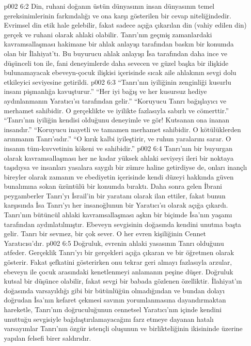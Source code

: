 \vs p002 6:2 Din, ruhani doğanın üstün dünyasının insan dünyasının temel gereksinimlerinin farkındalığı ve ona karşı gösterilen bir cevap niteliğindedir. Evrimsel din etik hale gelebilir, fakat sadece açığa çıkarılan din (vahiy edilen din) gerçek ve ruhani olarak ahlaki olabilir. Tanrı’nın geçmiş zamanlardaki kavramsallaşması hakimane bir ahlak anlayışı tarafından baskın bir konumda olan bir İlahiyat’tı. Bu buyurucu ahlak anlayışı İsa tarafından daha ince ve düşünceli ton ile, fani deneyimlerde daha sevecen ve güzel başka bir ilişkide bulunamayacak ebeveyn\hyp{}çocuk ilişkisi içerisinde sıcak aile ahlakının sevgi dolu etkileyici seviyesine getirildi.
\vs p002 6:3 “Tanrı’nın iyiliğinin zenginliği kusurlu insanı pişmanlığa kavuşturur.” “Her iyi bağış ve her kusursuz hediye aydınlanmanın Yaratıcı’sı tarafından gelir.” “Koruyucu Tanrı bağışlayıcı ve merhamet sahibidir. O gerçeklikte ve iyilikte fazlasıyla sabırlı ve cömerttir.” “Tanrı’nın iyiliğin kendisi olduğunu deneyimle ve gör! Kutsanan ona inanan insandır.” “Koruyucu inayetli ve tamamen merhamet sahibidir. O kötülüklerden arınmanın Tanrı’sıdır.” “O kırık kalbi iyileştirir, ve ruhun yaralarını sarar. O insanın tüm\hyp{}kuvvetinin kökeni ve sahibidir.”
\vs p002 6:4 Tanrı’nın bir buyurgan olarak kavramsallaşması her ne kadar yüksek ahlaki seviyeyi ileri bir noktaya taşıdıysa ve insanları yasalara saygılı bir zümre haline getirdiyse de, onları inançlı bireyler olarak zamanın ve ebediyetin içerisinde kendi düzeyi hakkında güven bunalımına sokan üzüntülü bir konumda bıraktı. Daha sonra gelen İbrani peygamberler Tanrı’yı İsrail’in bir yaratanı olarak ilan ettiler, fakat bunun karşısında İsa Tanrı’yı her insanoğlunun bir Yaratıcı’sı olarak açığa çıkardı. Tanrı’nın bütüncül ahlaki kavramsallaşması aşkın bir biçimde İsa’nın yaşamı tarafından aydınlatılmıştır. Ebeveyn sevgisinin doğasında kendini unutma başta gelir. Tanrı bir  sevmez, bir  çok sever. O her evren kişiliğinin Cennet Yaratıcısı’dır.
\vs p002 6:5 Doğruluk, evrenin ahlaki yasasının Tanrı olduğunu atfeder. Gerçeklik Tanrı’yı bir gerçekleri açığa çıkaran ve bir öğretmen olarak gösterir. Fakat şefkatini gösterirken onu tekrar geri almayı fazlasıyla arzular, ebeveyn ile çocuk arasındaki kenetlenmeyi anlamanın peşine düşer. Doğruluk kutsal bir düşünce olabilir, fakat sevgi bir babada gözlenen özelliktir. İlahiyat’ın doğasında varsayıldığı gibi bir bütünlüğün olmadığından ve bundan dolayı doğrudan İsa’nın kefaret çekmesi savının yorumlanmasına dayandırmaktan hareketle, Tanrı’nın doğruculuğunun cennetsel Yaratıcı’nın içinde kendini unuttuğu sevgisiyle bağdaştırılamayacağını farz etmeye dayanan hatalı varsayımlar Tanrı’nın özgür istençli oluşunun ve birlikteliğinin ikisininde üzerine yapılan felsefi birer saldırıdır.
